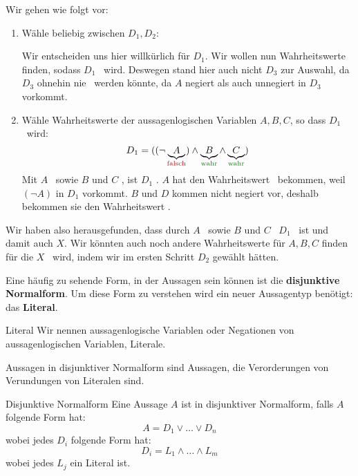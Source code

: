 \documentclass[../../main.tex]{subfiles}
\begin{document}
\begin{example}{}
        Wir gehen wie folgt vor:
        \begin{enumerate}
            \item Wähle beliebig zwischen $D_1,D_2$:

                Wir entscheiden uns hier willkürlich für $D_1$. Wir wollen nun 
                Wahrheitswerte finden, sodass $D_1$ \wahr\  wird. Deswegen stand 
                hier auch nicht $D_3$ zur Auswahl, da $D_3$ ohnehin nie \wahr\  
                werden könnte, da 
                $A$ negiert als auch unnegiert in $D_3$ vorkommt.
            \item Wähle Wahrheitswerte der aussagenlogischen Variablen $A,B,C$, 
            so dass $D_1$ \wahr\ wird:
                \[ D_1 = ((\lnot \underbrace{A}_{\falsch}) \land \underbrace{B}_{\wahr} \land \underbrace{C}_{\wahr})\] 
            Mit $A$ \falsch\  sowie $B$ und $C$ \wahr, ist $D_1$ \wahr. $A$ hat den Wahrheitswert
            \falsch\ bekommen, weil $(\lnot A)$ in $D_1$ vorkommt. $B$ und $D$ kommen nicht negiert 
            vor, deshalb bekommen sie den Wahrheitswert \wahr.
        \end{enumerate}
        Wir haben also herausgefunden, dass durch $A$ \falsch\  sowie $B$ 
        und $C$ \wahr\ 
        $D_1$ \wahr\ ist und damit auch $X$. 
        Wir könnten auch noch andere Wahrheitswerte für $A,B,C$ finden für die $X$ \wahr\ 
        wird, indem wir im ersten Schritt $D_2$ gewählt hätten.
    \end{example}

    Eine häufig zu sehende Form, in der Aussagen sein können ist die 
    \textbf{disjunktive Normalform}. Um diese Form zu verstehen wird ein neuer 
    Aussagentyp benötigt: das \textbf{Literal}.

    \begin{definition}{Literal}
        Wir nennen aussagenlogische Variablen oder Negationen von aussagenlogischen Variablen, Literale.
    \end{definition}

    Aussagen in disjunktiver Normalform sind Aussagen, die Verorderungen von Verundungen von
    Literalen sind.

    \begin{definition}{Disjunktive Normalform}
        Eine Aussage $A$ ist in disjunktiver Normalform, falls $A$ folgende Form hat:
        \[A = D_1 \lor \dots \lor D_n\]
        wobei jedes $D_i$ folgende Form hat:
        \[D_i = L_1 \land \dots \land L_m \]
        wobei jedes $L_j$ ein Literal ist.
    \end{definition}
\end{document}
